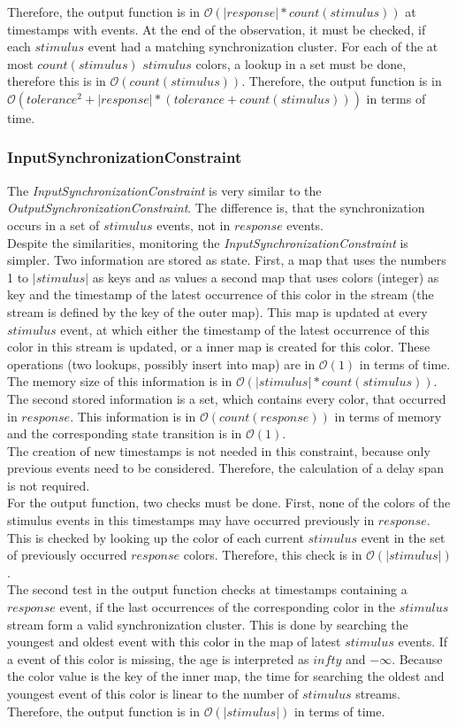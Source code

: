 	Therefore, the output function is in $\mathcal{O}(|response|*count(stimulus))$ at timestamps with events. At the end of the observation, it must be checked, if each $stimulus$ event had a matching synchronization cluster. For each of the at most $count(stimulus)$ $stimulus$ colors, a lookup in a set must be done, therefore this is in $\mathcal{O}(count(stimulus))$. Therefore, the output function is in $\mathcal{O}(tolerance^2+|response|*(tolerance+count(stimulus)))$ in terms of time.



\subsubsection{InputSynchronizationConstraint}
	The \emph{InputSynchronizationConstraint} is very similar to the \emph{OutputSynchronizationConstraint}. The difference is, that the synchronization occurs in a set of $stimulus$ events, not in $response$ events.\\
	Despite the similarities, monitoring the \emph{InputSynchronizationConstraint} is simpler. Two information are stored as state. First, a map that uses the numbers 1 to $|stimulus|$ as keys and as values a second map that uses colors (integer) as key and the timestamp of the latest occurrence of this color in the stream (the stream is defined by the key of the outer map). This map is updated at every $stimulus$ event, at which either the timestamp of the latest occurrence of this color in this stream is updated, or a inner map is created for this color. These operations (two lookups, possibly insert into map) are in $\mathcal{O}(1)$ in terms of time. The memory size of this information is in $\mathcal{O}(|stimulus|*count(stimulus))$.\\
	The second stored information is a set, which contains every color, that occurred in $response$. This information is in $\mathcal{O}(count(response))$ in terms of memory and the corresponding state transition is in $\mathcal{O}(1)$.\\
	The creation of new timestamps is not needed in this constraint, because only previous events need to be considered. Therefore, the calculation of a delay span is not required.\\
	For the output function, two checks must be done. First, none of the colors of the stimulus events in this timestamps may have occurred previously in $response$. This is checked by looking up the color of each current $stimulus$ event in the set of previously occurred $response$ colors. Therefore, this check is in $\mathcal{O}(|stimulus|)$.\\ The second test in the output function checks at timestamps containing a $response$ event, if the last occurrences of the corresponding color in the $stimulus$ stream form a valid synchronization cluster. This is done by searching the youngest and oldest event with this color in the map of latest $stimulus$ events. If a event of this color is missing, the age is interpreted as $infty$ and $-\infty$. Because the color value is the key of the inner map, the time for searching the oldest and youngest event of this color is linear to the number of $stimulus$ streams. Therefore, the output function is in $\mathcal{O}(|stimulus|)$ in terms of time.


	
	
